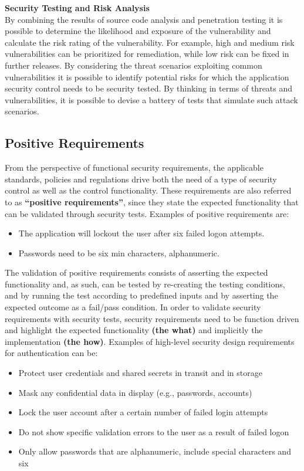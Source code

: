 		{\bf Security Testing and Risk Analysis}\\
		By combining the results of source code analysis and penetration testing it is possible to determine 
		the likelihood and exposure of the vulnerability and calculate the risk rating of the vulnerability. 
		For example, high and medium risk vulnerabilities can be prioritized for remediation, while low risk 
		can be fixed in further releases.
		By considering the threat scenarios exploiting common vulnerabilities it is possible to identify 
		potential risks for which the application security control needs to be security tested. By thinking 
		in terms of threats and vulnerabilities, it is possible to devise a battery of tests that simulate 
		such attack scenarios.


		\subsection{Positive Requirements}
			From the perspective of functional security requirements, the applicable standards, policies 
			and regulations drive both the need of a type of security control as well as the control  
			functionality. These requirements are also referred to as {\bf “positive requirements”}, 
			since they state the expected functionality that can be validated through security tests. 
			Examples of positive requirements are: 
				\begin{itemize}
					\item The application will lockout the user after six failed logon attempts.
					\item Passwords need to be six min characters, alphanumeric.
				\end{itemize}
			The validation of positive requirements consists of asserting the expected functionality and, 
			as such, can be tested by re-creating the testing conditions, and by running the test according 
			to predefined inputs and by asserting the expected outcome as a fail/pass condition.
			In order to validate security requirements with security tests, security requirements need to 
			be function driven and highlight the expected functionality {\bf (the what)} and implicitly 
			the implementation {\bf (the how)}. Examples of high-level security design requirements for 
			authentication can be:

				\begin{itemize}
					\item Protect user credentials and shared secrets in transit and in storage
					\item Mask any confidential data in display (e.g., passwords, accounts)
					\item Lock the user account after a certain number of failed login attempts
					\item Do not show specific validation errors to the user as a result of failed logon
					\item Only allow passwords that are alphanumeric, include special characters and six 
				\end{itemize}

